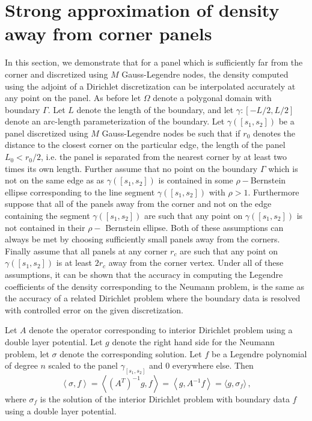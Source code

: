 \documentclass[12pt]{article}
\begin{document}
\section{Strong approximation of density away from corner panels}
\label{sec:appb}
In this section, we demonstrate that for a panel which is sufficiently far from the corner and  discretized using $M$ Gauss-Legendre nodes, the density computed using the adjoint of a Dirichlet discretization can be interpolated 
accurately at any point on the panel. As before let $\Omega$ denote a polygonal domain with boundary $\Gamma$. Let
$L$ denote the length of the boundary, and let $\gamma: [-L/2,L/2]$ denote an arc-length parameterization of the boundary.
Let $\gamma([s_{1},s_{2}])$ be a panel discretized using $M$ Gauss-Legendre nodes be such that if $r_{0}$ denotes
the distance to the closest corner on the particular edge, the length of the panel $L_{0}<r_{0}/2$, i.e. the panel
is separated from the nearest corner by at least two times its own length. Further assume that no point on the boundary $\Gamma$ which is not on the same edge as as $\gamma([s_{1},s_{2}])$ is contained in some $\rho-$Bernstein ellipse
corresponding to the line segment $\gamma([s_{1},s_{2}])$ with $\rho>1$. Furthermore suppose that all of the panels away from the corner and not on the edge containing the segment $\gamma([s_{1},s_{2}])$ are such that any point on $\gamma([s_{1},s_{2}])$ is not contained in their $\rho-$ Bernstein ellipse.
Both of these assumptions can always be met by choosing sufficiently small panels away from the corners. Finally 
assume that all panels at any corner $r_{c}$ are such that any point on $\gamma([s_{1},s_{2}])$ is at least $2r_{c}$ 
away from the corner vertex. Under all of these assumptions, it can be shown that the accuracy in computing the
Legendre coefficients of the density corresponding to the Neumann problem, is the same as the accuracy
of a related Dirichlet problem where the boundary data is resolved with controlled error on the given discretization.

Let $A$ denote the operator corresponding to interior Dirichlet problem using a double layer potential. Let $g$ denote the
right hand side for the Neumann problem, let $\sigma$ denote the corresponding solution. Let $f$ be a Legendre polynomial of
degree $n$ scaled to the panel $\gamma_{[s_{1},s_{2}]}$ and $0$ everywhere else. Then
\begin{equation}
\left<\sigma, f \right> = \left< (A^{T})^{-1} g, f\right> = \left< g, A^{-1} f \right> = \langle g, \sigma_{f}\rangle \, ,
\end{equation}
where $\sigma_{f}$ is the solution of the interior Dirichlet problem with boundary data $f$ using a double layer potential.
 
\end{document}
